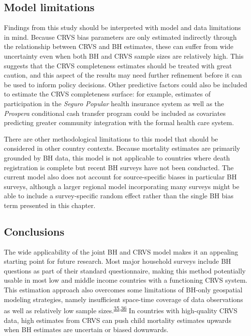 \documentclass[
]{article}
\begin{document}
\hypertarget{model-limitations}{%
\subsection{Model limitations}\label{model-limitations}}

Findings from this study should be interpreted with model and data limitations in mind. Because CRVS bias parameters are only estimated indirectly through the relationship between CRVS and BH estimates, these can suffer from wide uncertainty even when both BH and CRVS sample sizes are relatively high. This suggests that the CRVS completeness estimates should be treated with great caution, and this aspect of the results may need further refinement before it can be used to inform policy decisions. Other predictive factors could also be included to estimate the CRVS completeness surface: for example, estimates of participation in the \emph{Seguro Popular} health insurance system as well as the \emph{Prospera} conditional cash transfer program could be included as covariates predicting greater community integration with the formal health care system.

There are other methodological limitations to this model that should be considered in other country contexts. Because mortality estimates are primarily grounded by BH data, this model is not applicable to countries where death registration is complete but recent BH surveys have not been conducted. The current model also does not account for source-specific biases in particular BH surveys, although a larger regional model incorporating many surveys might be able to include a survey-specific random effect rather than the single BH bias term presented in this chapter.

\hypertarget{conclusions}{%
\subsection{Conclusions}\label{conclusions}}

The wide applicability of the joint BH and CRVS model makes it an appealing starting point for future research. Most major household surveys include BH questions as part of their standard questionnaire, making this method potentially usable in most low and middle income countries with a functioning CRVS system. This estimation approach also overcomes some limitations of BH-only geospatial modeling strategies, namely insufficient space-time coverage of data observations as well as relatively low sample sizes.\textsuperscript{\protect\hyperlink{ref-Burstein2019}{35},\protect\hyperlink{ref-Wakefield2019}{36}} In countries with high-quality CRVS data, high estimates from CRVS can push child mortality estimates upwards when BH estimates are uncertain or biased downwards.
\end{document}
